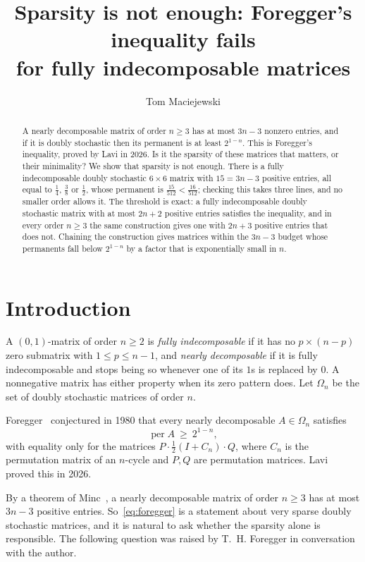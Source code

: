 \documentclass[11pt]{amsart}
\title[Sparsity is not enough]{Sparsity is not enough: Foregger's inequality fails\\
for fully indecomposable matrices}
\author{Tom Maciejewski}
\theoremstyle{remark}
\DeclareMathOperator{\per}{per}
\newcommand{\half}{\tfrac12}
\begin{document}
\begin{abstract}
A nearly decomposable matrix of order $n\ge3$ has at most $3n-3$ nonzero entries,
and if it is doubly stochastic then its permanent is at least $2^{1-n}$. This
is Foregger's inequality, proved by Lavi in 2026. Is it the sparsity of these
matrices that matters, or their minimality? We show that sparsity is not
enough. There is a fully indecomposable doubly stochastic $6\times6$ matrix
with $15=3n-3$ positive entries, all equal to $\frac14$, $\frac38$ or
$\frac12$, whose permanent is $\frac{15}{512}<\frac{16}{512}$; checking this
takes three lines, and no smaller order allows it. The threshold is exact: a
fully indecomposable doubly stochastic matrix with at most $2n+2$ positive
entries satisfies the inequality, and in every order $n\ge3$ the same
construction gives one with $2n+3$ positive entries that does not. Chaining the
construction gives matrices within the $3n-3$ budget whose permanents fall below
$2^{1-n}$ by a factor that is exponentially small in $n$.
\end{abstract}

\maketitle

\section{Introduction}

A $(0,1)$-matrix of order $n\ge2$ is \emph{fully indecomposable} if it has no
$p\times(n-p)$ zero submatrix with $1\le p\le n-1$, and \emph{nearly
decomposable} if it is fully indecomposable and stops being so whenever one of
its $1$s is replaced by $0$. A nonnegative matrix has either property when its
zero pattern does. Let $\Omega_n$ be the set of doubly stochastic matrices of
order $n$.

Foregger~\cite{Foregger} conjectured in 1980 that every nearly decomposable
$A\in\Omega_n$ satisfies
\begin{equation}\label{eq:foregger}
  \per A\ \ge\ 2^{1-n},
\end{equation}
with equality only for the matrices $P\cdot\half(I+C_n)\cdot Q$, where $C_n$
is the permutation matrix of an $n$-cycle and $P,Q$ are permutation matrices.
Lavi~\cite{Lavi} proved this in 2026.

By a theorem of Minc~\cite{Minc}, a nearly decomposable matrix of order
$n\ge3$ has at most $3n-3$ positive entries. So~\eqref{eq:foregger} is a
statement about very sparse doubly stochastic matrices, and it is natural to
ask whether the sparsity alone is responsible.
The following question was raised by T.~H. Foregger in conversation with the author.
\end{document}
